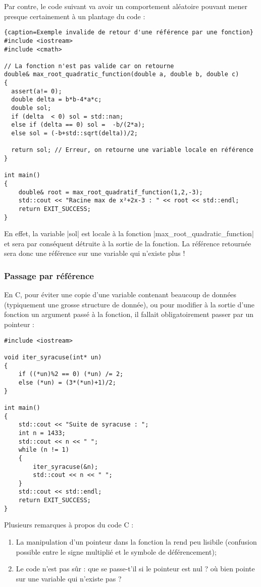 Par contre, le code suivant va avoir un comportement aléatoire pouvant mener presque certainement à un plantage du code :

\begin{lstlisting}{caption=Exemple invalide de retour d'une référence par une fonction}
#include <iostream>
#include <cmath>

// La fonction n'est pas valide car on retourne 
double& max_root_quadratic_function(double a, double b, double c)
{
  assert(a!= 0);
  double delta = b*b-4*a*c;
  double sol;
  if (delta  < 0) sol = std::nan;
  else if (delta == 0) sol =  -b/(2*a);
  else sol = (-b+std::sqrt(delta))/2;

  return sol; // Erreur, on retourne une variable locale en référence
}

int main()
{
    double& root = max_root_quadratif_function(1,2,-3);
    std::cout << "Racine max de x²+2x-3 : " << root << std::endl;
    return EXIT_SUCCESS;
}
\end{lstlisting}

En effet, la variable |sol| est locale à la fonction |max\_root\_quadratic\_function| et sera par conséquent détruite
à la sortie de la fonction. La référence retournée sera donc une référence sur une variable qui n'existe plus !

\subsubsection{Passage par référence}

En C, pour éviter une copie d'une variable contenant beaucoup de données (typiquement une grosse structure de donnée),
ou pour modifier à la sortie d'une fonction un argument passé à la fonction, il fallait obligatoirement passer par un pointeur :

\begin{lstlisting}[caption=fonction C avec modification des arguments d'entrée]
#include <iostream>

void iter_syracuse(int* un)
{
    if ((*un)%2 == 0) (*un) /= 2;
    else (*un) = (3*(*un)+1)/2;
}

int main()
{
    std::cout << "Suite de syracuse : ";
    int n = 1433;
    std::cout << n << " ";
    while (n != 1)
    {
        iter_syracuse(&n);
        std::cout << n << " ";
    }
    std::cout << std::endl;
    return EXIT_SUCCESS;
}
\end{lstlisting}

Plusieurs remarques à propos du code C :
\begin{enumerate}
    \item La manipulation d'un pointeur dans la fonction la rend peu lisibile (confusion possible entre le signe multiplié et le symbole de déférencement);
    \item Le code n'est pas sûr : que se passe-t'il si le pointeur est nul ? où bien pointe sur une variable qui n'existe pas ?
\end{enumerate}

